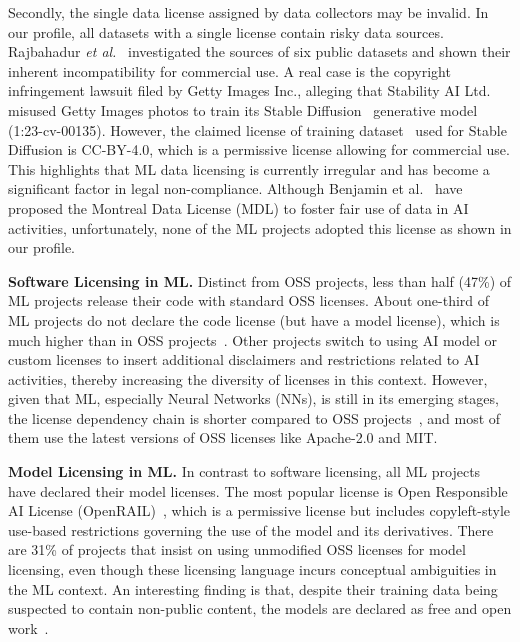 Secondly, the single data license assigned by data collectors may be invalid.
In our profile, all datasets with a single license contain risky data sources.
Rajbahadur \textit{et al.}~\cite{rajbahadur2021can} investigated the sources of six public datasets and shown their inherent incompatibility for commercial use.
A real case is the copyright infringement lawsuit filed by Getty Images Inc., alleging that Stability AI Ltd. misused Getty Images photos to train its Stable Diffusion~\cite{rombach2022high} generative model (1:23-cv-00135).
However, the claimed license of training dataset~\cite{schuhmann2022laion} used for Stable Diffusion is CC-BY-4.0, which is a permissive license allowing for commercial use.
This highlights that ML data licensing is currently irregular and has become a significant factor in legal non-compliance.
Although Benjamin et al.~\cite{benjamin2019towards} have proposed the Montreal Data License (MDL) to foster fair use of data in AI activities, unfortunately, none of the ML projects adopted this license as shown in our profile.

\textbf{Software Licensing in ML.}
Distinct from OSS projects, less than half (47\%) of ML projects release their code with standard OSS licenses.
About one-third of ML projects do not declare the code license (but have a model license), which is much higher than in OSS projects~\cite{cui2023empirical}.
Other projects switch to using AI model or custom licenses to insert additional disclaimers and restrictions related to AI activities, thereby increasing the diversity of licenses in this context.
However, given that ML, especially Neural Networks (NNs), is still in its emerging stages, the license dependency chain is shorter compared to OSS projects~\cite{buchkova2022dasea}, and most of them use the latest versions of OSS licenses like Apache-2.0 and MIT.


\textbf{Model Licensing in ML.}
In contrast to software licensing, all ML projects have declared their model licenses.
The most popular license is Open Responsible AI License (OpenRAIL)~\cite{contractor2022behavioral}, which is a permissive license but includes copyleft-style use-based restrictions governing the use of the model and its derivatives.
There are 31\% of projects that insist on using unmodified OSS licenses for model licensing, even though these licensing language incurs conceptual ambiguities in the ML context.
An interesting finding is that, despite their training data being suspected to contain non-public content, the models are declared as free and open work~\cite{henderson2023foundation}.

